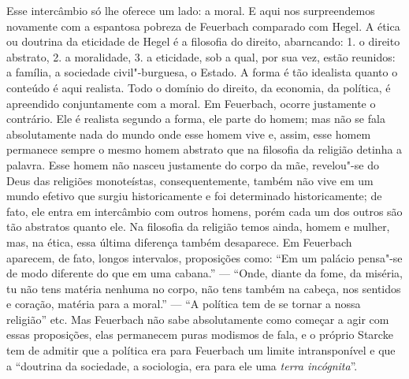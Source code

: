 Esse intercâmbio só lhe oferece um lado: a moral. E aqui nos
surpreendemos novamente com a espantosa pobreza
de Feuerbach comparado
com Hegel.
A ética ou doutrina da eticidade de Hegel é a filosofia do direito,
abarncando: 1. o direito abstrato, 2. a moralidade, 3. a eticidade, sob
a qual, por sua vez, estão reunidos: a família, a sociedade
civil"-burguesa, o Estado. A forma é tão idealista quanto o conteúdo é
aqui realista. Todo o domínio do direito, da economia, da política, é
apreendido conjuntamente com a moral.
Em Feuerbach,
ocorre justamente o contrário. Ele é realista segundo a forma, ele parte
do homem; mas não se fala absolutamente nada do mundo onde esse homem
vive e, assim, esse homem permanece sempre o mesmo homem abstrato que na
filosofia da religião detinha a palavra. Esse homem não nasceu
justamente do corpo da mãe, revelou"-se do Deus das religiões
monoteístas, consequentemente, também não vive em um mundo efetivo que
surgiu historicamente e foi determinado historicamente; de fato, ele
entra em intercâmbio com outros homens, porém cada um dos outros são tão
abstratos quanto ele. Na filosofia da religião temos ainda, homem e
mulher, mas, na ética, essa última diferença também desaparece.
Em Feuerbach
aparecem, de fato, longos intervalos, proposições como: ``Em um palácio
pensa"-se de modo diferente do que em uma cabana.'' --- ``Onde, diante da
fome, da miséria, tu não tens matéria nenhuma no corpo, não tens também
na cabeça, nos sentidos e coração, matéria
para a moral.'' --- ``A política tem de se tornar a nossa
religião'' etc.
Mas Feuerbach não
sabe absolutamente como começar a agir com essas proposições, elas
permanecem puras modismos de fala, e o próprio Starcke tem de admitir
que a política era
para Feuerbach um
limite intransponível e que a ``doutrina da sociedade, a sociologia, era
para ele uma \emph{terra
incógnita}''.

